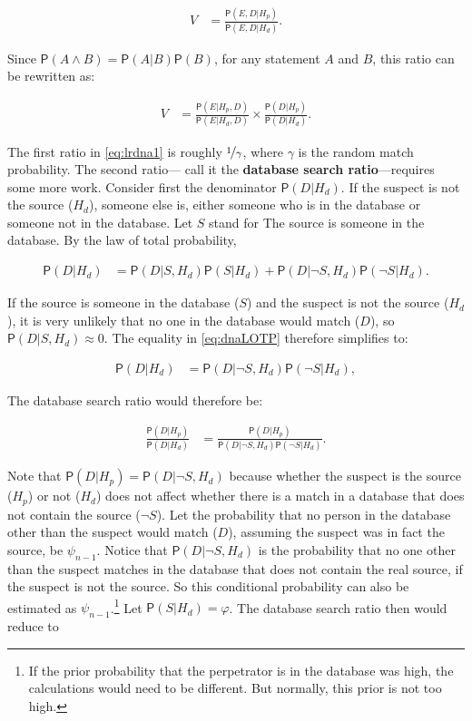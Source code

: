 \documentclass[10pt,dvipsnames,enabledeprecatedfontcommands]{scrartcl}
\newcommand{\pr}[1]{\mathsf{P}(#1)}
\begin{document}
\begin{align*}
V & = \frac{\pr{E,D\vert H_p}}{\pr{E,D\vert H_d}}.
\end{align*}

Since \(\pr{A\wedge B}=\pr{A\vert B}\pr{B}\), for any statement \(A\)
and \(B\), this ratio can be rewritten as:

\begin{align}\label{eq:lrdna1}
V & = \frac{\pr{E\vert H_p,D}}{\pr{E\vert H_d,D}} \times \frac{\pr{D\vert H_p}}{\pr{D\vert H_d}}.
\end{align}

\noindent The first ratio in \eqref{eq:lrdna1} is roughly
\(\nicefrac{1}{\gamma}\), where \(\gamma\) is the random match
probability. The second ratio--- call it the
\textbf{database search ratio}---requires some more work. Consider first
the denominator \(\pr{D \vert H_d}\). If the suspect is not the source
(\(H_d\)), someone else is, either someone who is in the database or
someone not in the database. Let \(S\) stand for
\textsf{The  source is someone in the database.} By the law of total
probability,

\begin{align}\label{eq:dnaLOTP}
\pr{D\vert H_d} & = \pr{D\vert S, H_d} \pr{S\vert H_d} + \pr{D\vert \neg S, H_d} \pr{\neg S \vert H_d}. 
\end{align}

If the source is someone in the database (\(S\)) and the suspect is not
the source (\(H_d\)), it is very unlikely that no one in the database
would match (\(D\)), so \(\pr{D\vert S, H_d}\approx 0\). The equality in
\eqref{eq:dnaLOTP} therefore simplifies to: \vspace{-4mm}

\begin{align*}
\pr{D\vert H_d} & =  \pr{D\vert \neg S, H_d} \pr{\neg S \vert H_d}, 
\end{align*}

\noindent The database search ratio would therefore be:

\begin{align*}
\frac{\pr{D\vert H_p}}{\pr{D\vert H_d}} & = \frac{\pr{D\vert H_p}}{\pr{D\vert \neg S, H_d} \pr{\neg S \vert H_d}}.
\end{align*}

\noindent Note that \(\pr{D\vert H_p}=\pr{D\vert \neg S, H_d}\) because
whether the suspect is the source (\(H_p\)) or not (\(H_d\)) does not
affect whether there is a match in a database that does not contain the
source (\(\neg S\)). Let the probability that no person in the database
other than the suspect would match (\(D\)), assuming the suspect was in
fact the source, be \(\psi_{n-1}\). Notice that
\(\pr{D\vert \neg S, H_d}\) is the probability that no one other than
the suspect matches in the database that does not contain the real
source, if the suspect is not the source. So this conditional
probability can also be estimated as
\(\psi_{n-1}\).\footnote{If the prior probability that the perpetrator is in the database was high, the calculations would need to be different. But normally, this prior is not too high.}
Let \(\pr{S | H_d}=\varphi\). The database search ratio then would
reduce to \vspace{-2mm}
\end{document}
